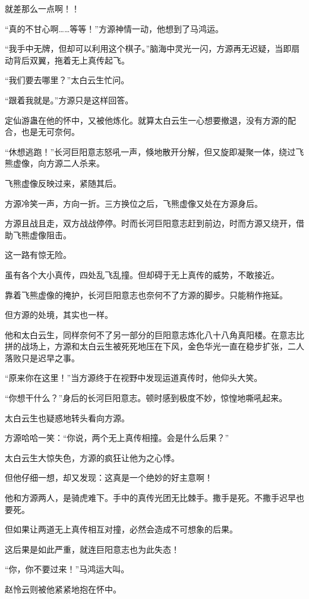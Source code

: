 \begin{this_body}
就差那么一点啊！！

“真的不甘心啊……等等！”方源神情一动，他想到了马鸿运。

“我手中无牌，但却可以利用这个棋子。”脑海中灵光一闪，方源再无迟疑，当即扇动背后双翼，拖着无上真传起飞。

“我们要去哪里？”太白云生忙问。

“跟着我就是。”方源只是这样回答。

定仙游蛊在他的怀中，又被他炼化。就算太白云生一心想要撤退，没有方源的配合，也是无可奈何。

“休想逃跑！”长河巨阳意志怒吼一声，倏地散开分解，但又旋即凝聚一体，绕过飞熊虚像，向方源二人杀来。

飞熊虚像反映过来，紧随其后。

方源冷笑一声，方向一折。三方换位之后，飞熊虚像又处在方源身后。

方源且战且走，双方战战停停。时而长河巨阳意志赶到前边，时而方源又绕开，借助飞熊虚像阻击。

这一路有惊无险。

虽有各个大小真传，四处乱飞乱撞。但却碍于无上真传的威势，不敢接近。

靠着飞熊虚像的掩护，长河巨阳意志也奈何不了方源的脚步。只能稍作拖延。

但方源的处境，其实也一样。

他和太白云生，同样奈何不了另一部分的巨阳意志炼化八十八角真阳楼。在意志比拼的战场上，方源和太白云生被死死地压在下风，金色华光一直在稳步扩张，二人落败只是迟早之事。

“原来你在这里！”当方源终于在视野中发现运道真传时，他仰头大笑。

“你想干什么？”身后的长河巨阳意志。顿时感到极度不妙，惊惶地嘶吼起来。

太白云生也疑惑地转头看向方源。

方源哈哈一笑：“你说，两个无上真传相撞。会是什么后果？”

太白云生大惊失色，方源的疯狂让他为之心悸。

但他仔细一想，却又发现：这真是一个绝妙的好主意啊！

他和方源两人，是骑虎难下。手中的真传光团无比棘手。撒手是死。不撒手迟早也要死。

但如果让两道无上真传相互对撞，必然会造成不可想象的后果。

这后果是如此严重，就连巨阳意志也为此失态！

“你，你不要过来！”马鸿运大叫。

赵怜云则被他紧紧地抱在怀中。


\end{this_body}
